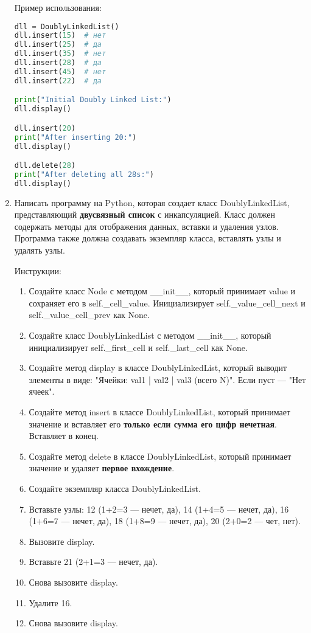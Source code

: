 \begin{enumerate}
Пример использования:
\begin{lstlisting}[language=Python]
dll = DoublyLinkedList()
dll.insert(15)  # нет
dll.insert(25)  # да
dll.insert(35)  # нет
dll.insert(28)  # да
dll.insert(45)  # нет
dll.insert(22)  # да

print("Initial Doubly Linked List:")
dll.display()

dll.insert(20)
print("After inserting 20:")
dll.display()

dll.delete(28)
print("After deleting all 28s:")
dll.display()
\end{lstlisting}

\item Написать программу на Python, которая создает класс DoublyLinkedList, представляющий \textbf{двусвязный список} с инкапсуляцией. Класс должен содержать методы для отображения данных, вставки и удаления узлов. Программа также должна создавать экземпляр класса, вставлять узлы и удалять узлы.

Инструкции:
\begin{enumerate}
    \item Создайте класс Node с методом \_\_init\_\_, который принимает value и сохраняет его в self.\_cell\_value. Инициализирует self.\_value\_cell\_next и self.\_value\_cell\_prev как None.
    \item Создайте класс DoublyLinkedList с методом \_\_init\_\_, который инициализирует self.\_first\_cell и self.\_last\_cell как None.
    \item Создайте метод display в классе DoublyLinkedList, который выводит элементы в виде: "Ячейки: val1 | val2 | val3 (всего N)". Если пуст — "Нет ячеек".
    \item Создайте метод insert в классе DoublyLinkedList, который принимает значение и вставляет его \textbf{только если сумма его цифр нечетная}. Вставляет в конец.
    \item Создайте метод delete в классе DoublyLinkedList, который принимает значение и удаляет \textbf{первое вхождение}.
    \item Создайте экземпляр класса DoublyLinkedList.
    \item Вставьте узлы: 12 (1+2=3 — нечет, да), 14 (1+4=5 — нечет, да), 16 (1+6=7 — нечет, да), 18 (1+8=9 — нечет, да), 20 (2+0=2 — чет, нет).
    \item Вызовите display.
    \item Вставьте 21 (2+1=3 — нечет, да).
    \item Снова вызовите display.
    \item Удалите 16.
    \item Снова вызовите display.
\end{enumerate}


\end{enumerate}
